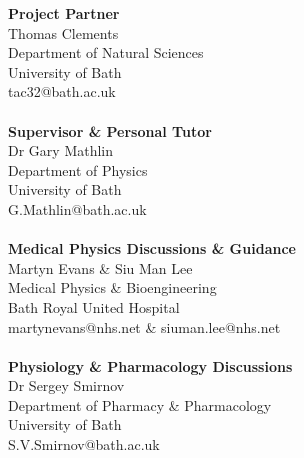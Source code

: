 \textbf{Project Partner}\\
Thomas Clements\\
Department of Natural Sciences\\
University of Bath\\
tac32@bath.ac.uk\\
\\
\textbf{Supervisor \& Personal Tutor}\\
Dr Gary Mathlin\\
Department of Physics\\
University of Bath\\
G.Mathlin@bath.ac.uk\\
\\
\textbf{Medical Physics Discussions \& Guidance}\\
Martyn Evans \& Siu Man Lee\\
Medical Physics \& Bioengineering\\
Bath Royal United Hospital\\
martynevans@nhs.net \& siuman.lee@nhs.net\\
\\
\textbf{Physiology \& Pharmacology Discussions}\\
Dr Sergey Smirnov\\
Department of Pharmacy \& Pharmacology\\
University of Bath\\
S.V.Smirnov@bath.ac.uk\\